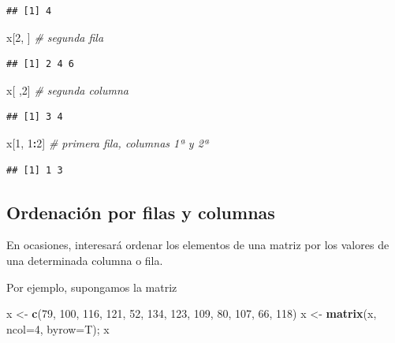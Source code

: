 \documentclass[]{book}
\newenvironment{Shaded}{\begin{snugshade}}{\end{snugshade}}
\newcommand{\CommentTok}[1]{\textcolor[rgb]{0.56,0.35,0.01}{\textit{#1}}}
\newcommand{\DataTypeTok}[1]{\textcolor[rgb]{0.13,0.29,0.53}{#1}}
\newcommand{\DecValTok}[1]{\textcolor[rgb]{0.00,0.00,0.81}{#1}}
\newcommand{\KeywordTok}[1]{\textcolor[rgb]{0.13,0.29,0.53}{\textbf{#1}}}
\newcommand{\NormalTok}[1]{#1}
\newcommand{\OperatorTok}[1]{\textcolor[rgb]{0.81,0.36,0.00}{\textbf{#1}}}
\newcommand{\StringTok}[1]{\textcolor[rgb]{0.31,0.60,0.02}{#1}}
\begin{document}
\begin{verbatim}
## [1] 4
\end{verbatim}

\begin{Shaded}
\begin{Highlighting}[]
\NormalTok{x[}\DecValTok{2}\NormalTok{, ]  }\CommentTok{# segunda fila}
\end{Highlighting}
\end{Shaded}

\begin{verbatim}
## [1] 2 4 6
\end{verbatim}

\begin{Shaded}
\begin{Highlighting}[]
\NormalTok{x[ ,}\DecValTok{2}\NormalTok{]  }\CommentTok{# segunda columna}
\end{Highlighting}
\end{Shaded}

\begin{verbatim}
## [1] 3 4
\end{verbatim}

\begin{Shaded}
\begin{Highlighting}[]
\NormalTok{x[}\DecValTok{1}\NormalTok{, }\DecValTok{1}\OperatorTok{:}\DecValTok{2}\NormalTok{]  }\CommentTok{# primera fila, columnas 1ª y 2ª }
\end{Highlighting}
\end{Shaded}

\begin{verbatim}
## [1] 1 3
\end{verbatim}

\hypertarget{ordenacion-por-filas-y-columnas}{%
\subsection{Ordenación por filas y columnas}\label{ordenacion-por-filas-y-columnas}}

En ocasiones, interesará ordenar los elementos de una matriz por los valores de una
determinada columna o fila.

Por ejemplo, supongamos la matriz

\begin{Shaded}
\begin{Highlighting}[]
\NormalTok{x <-}\StringTok{ }\KeywordTok{c}\NormalTok{(}\DecValTok{79}\NormalTok{, }\DecValTok{100}\NormalTok{, }\DecValTok{116}\NormalTok{, }\DecValTok{121}\NormalTok{, }\DecValTok{52}\NormalTok{, }\DecValTok{134}\NormalTok{, }\DecValTok{123}\NormalTok{, }\DecValTok{109}\NormalTok{, }\DecValTok{80}\NormalTok{, }\DecValTok{107}\NormalTok{, }\DecValTok{66}\NormalTok{, }\DecValTok{118}\NormalTok{)}
\NormalTok{x <-}\StringTok{ }\KeywordTok{matrix}\NormalTok{(x, }\DataTypeTok{ncol=}\DecValTok{4}\NormalTok{, }\DataTypeTok{byrow=}\NormalTok{T); x}
\end{Highlighting}
\end{Shaded}
\end{document}
